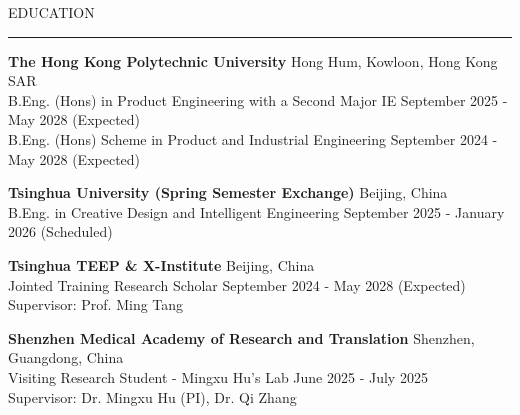 \documentclass{resume} %
\renewenvironment{rSection}[1]{
\sectionskip
\textcolor{TsinghuaPurple}{\MakeUppercase{#1}}
\sectionlineskip
\hrule
\begin{list}{}{
\setlength{\leftmargin}{0em}
}
\item[]
}{
\end{list}
}
\begin{document}
  


\begin{rSection}{Education}
{\bf The Hong Kong Polytechnic University} \hfill {Hong Hum, Kowloon, Hong Kong SAR}\\
{B.Eng. (Hons) in Product Engineering with a Second Major IE} \hfill {September 2025 - May 2028 (Expected)}\\
{B.Eng. (Hons) Scheme in Product and Industrial Engineering} \hfill {September 2024 - May 2028 (Expected)}

{\bf Tsinghua University (Spring Semester Exchange)} \hfill {Beijing, China}\\
{B.Eng. in Creative Design and Intelligent Engineering} \hfill {September 2025 - January 2026 (Scheduled)}

{\bf Tsinghua TEEP \& X-Institute} \hfill {Beijing, China}\\
{Jointed Training Research Scholar} \hfill {September 2024 - May 2028 (Expected)}\\
{Supervisor: Prof. Ming Tang}

{\bf Shenzhen Medical Academy of Research and Translation} \hfill {Shenzhen, Guangdong, China}\\
{Visiting Research Student - Mingxu Hu's Lab} \hfill {June 2025 - July 2025}\\
{Supervisor: Dr. Mingxu Hu (PI), Dr. Qi Zhang}

\end{rSection} 
\end{document}
